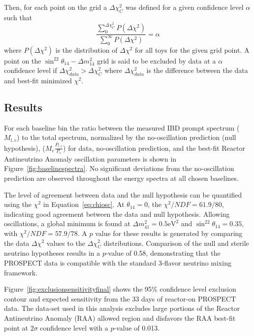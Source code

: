 Then, for each point on the grid a $\Delta\chi^2_C$ was defined for a given confidence level $\alpha$ such that
\begin{equation}
	\frac{\sum_{0}^{\Delta\chi^2_C}P(\Delta\chi^2)}{\sum_{0}^{\infty}P(\Delta\chi^2)} = \alpha
\end{equation}
where $P(\Delta\chi^2)$ is the distribution of $\Delta\chi^2$ for all toys for the given grid point.
A point on the $\sin^22\theta_{14}-\Delta m^2_{14}$ grid is said to be excluded by data at a $\alpha$ confidence level if $\Delta\chi^2_{data} > \Delta\chi^2_{C}$ where $\Delta\chi^2_{data}$ is the difference between the data and best-fit minimized $\chi^2$.


\subsection{Results}

For each baseline bin the ratio between the measured IBD prompt spectrum ($M_{l,e}$) to the total spectrum, normalized by the no-oscillation prediction (null hypothesis), ($M_e\frac{P_{l,e}}{P_e}$) for data, no-oscillation prediction, and the best-fit Reactor Antineutrino Anomaly oscillation parameters is shown in Figure~\ref{fig:baselinespectra}.
No significant deviations from the no-oscillation prediction are observed throughout the energy spectra at all chosen baselines.

The level of agreement between data and the null hypothesis can be quantified using the $\chi^2$ in Equation~\ref{eq:chiosc}.
At $\theta_{14} = 0$, the $\chi^2/NDF = 61.9/80$, indicating good agreement between the data and null hypothesis.
Allowing oscillations, a global minimum is found at $\Delta m^2_{41} = 0.5 \textrm{eV}^2$ and $\sin^22\theta_{14} = 0.35$, with $\chi^2/NDF = 57.9/78$.
A $p$ value for these results is generated by comparing the data $\Delta\chi^2$ values to the $\Delta\chi^2_C$ distributions. 
Comparison of the null and sterile neutrino hypotheses results in a $p$-value of 0.58, demonstrating that the PROSPECT data is compatible with the standard 3-flavor neutrino mixing framework.

Figure~\ref{fig:exclusionsensitivityfinal} shows the 95\% confidence level exclusion contour and expected sensitivity from the 33 days of reactor-on PROSPECT data.
The data-set used in this analysis excludes large portions of the Reactor Antineutrino Anomaly (RAA) allowed region and disfavors the RAA best-fit point at 2$\sigma$ confidence level with a $p$-value of 0.013.

